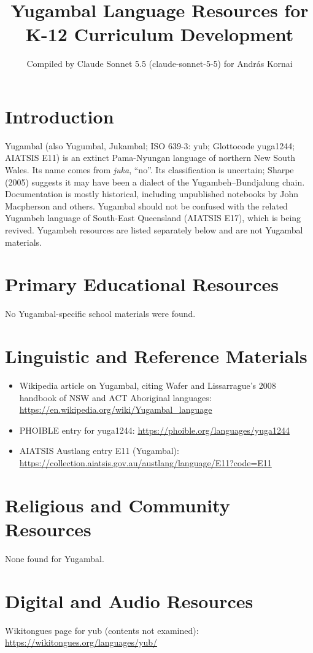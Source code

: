 \documentclass[12pt]{article}
\title{Yugambal Language Resources for K-12 Curriculum Development}
\author{Compiled by Claude Sonnet 5.5 (claude-sonnet-5-5) for Andr\'as Kornai}
\date{}
\begin{document}
\maketitle

\section{Introduction}
Yugambal (also Yugumbal, Jukambal; ISO 639-3: yub; Glottocode yuga1244; AIATSIS E11) is an extinct Pama-Nyungan language of northern New South Wales. Its name comes from \emph{juka}, ``no''. Its classification is uncertain; Sharpe (2005) suggests it may have been a dialect of the Yugambeh--Bundjalung chain. Documentation is mostly historical, including unpublished notebooks by John Macpherson and others. Yugambal should not be confused with the related Yugambeh language of South-East Queensland (AIATSIS E17), which is being revived. Yugambeh resources are listed separately below and are not Yugambal materials.

\section{Primary Educational Resources}
No Yugambal-specific school materials were found.

\section{Linguistic and Reference Materials}
\begin{itemize}
\item Wikipedia article on Yugambal, citing Wafer and Lissarrague's 2008 handbook of NSW and ACT Aboriginal languages: \url{https://en.wikipedia.org/wiki/Yugambal_language}
\item PHOIBLE entry for yuga1244: \url{https://phoible.org/languages/yuga1244}
\item AIATSIS Austlang entry E11 (Yugambal): \url{https://collection.aiatsis.gov.au/austlang/language/E11?code=E11}
\end{itemize}

\section{Religious and Community Resources}
None found for Yugambal.

\section{Digital and Audio Resources}
Wikitongues page for yub (contents not examined): \url{https://wikitongues.org/languages/yub/}
\end{document}
